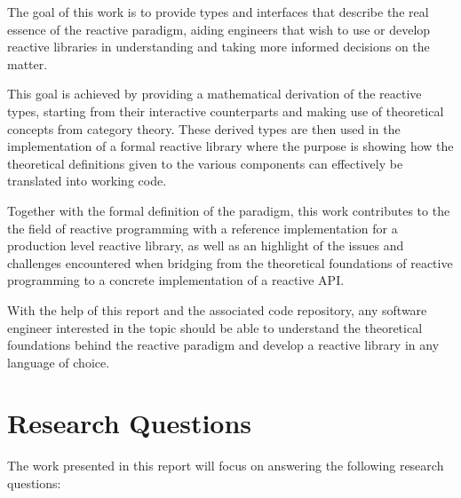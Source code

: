 The goal of this work is to provide types and interfaces that describe the real essence of the reactive paradigm, aiding engineers that wish to use or develop reactive libraries in understanding and taking more informed decisions on the matter.

This goal is achieved by providing a mathematical derivation of the reactive types, starting from their interactive counterparts and making use of theoretical concepts from category theory. These derived types are then used in the implementation of a formal reactive library where the purpose is showing how the theoretical definitions given to the various components can effectively be translated into working code. 

Together with the formal definition of the paradigm, this work contributes to the the field of reactive programming with a reference implementation for a production level reactive library, as well as an highlight of the issues and challenges encountered when bridging from the theoretical foundations of reactive programming to a concrete implementation of a reactive API. 

With the help of this report and the associated code repository, any software engineer interested in the topic should be able to understand the theoretical foundations behind the reactive paradigm and develop a reactive library in any language of choice.

\section*{Research Questions}

The work presented in this report will focus on answering the following research questions:

